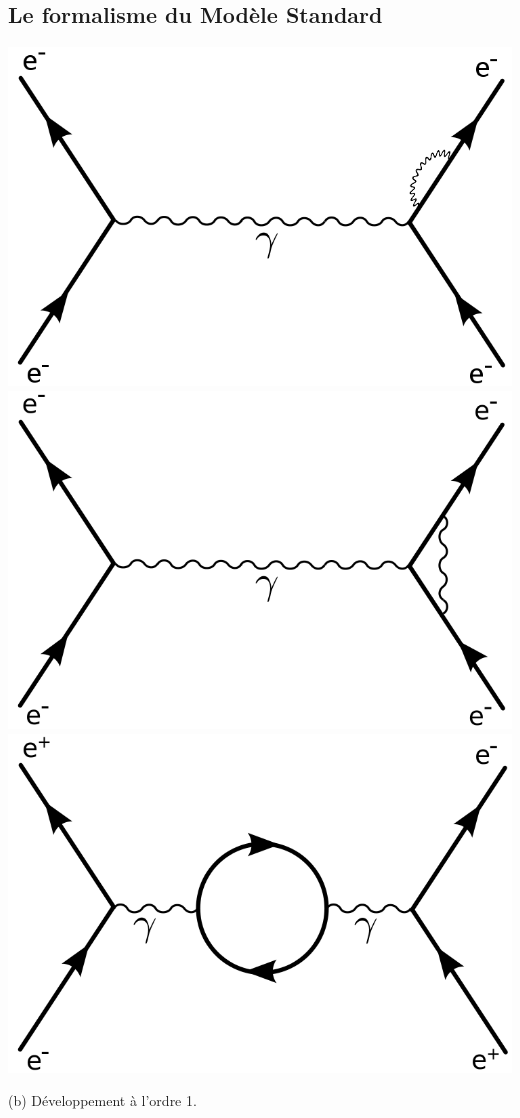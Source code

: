 \subsection{Le formalisme du Modèle Standard}
\marginpar
{
\begin{center}
\includegraphics[width=\marginparwidth]{SM/feyn1.png}
\includegraphics[width=\marginparwidth]{SM/feyn2.png}
\includegraphics[width=\marginparwidth]{SM/feyn3.png}
\begin{center}\normalfont\small {(b) Développement à l'ordre 1.}\end{center}
\label{feyn}
\end{center}
}
